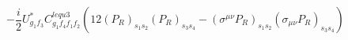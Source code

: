 %
\begin{dmath*}
%
  -  \frac{i}{2}U_{g_1 f_3}^* C^{lequ3}_{g_1 f_4 f_1 f_2} \left(12 (P_R)_{s_1 s_2} (P_R)_{s_3 s_4} - (\sigma^{\mu\nu} P_R)_{s_1 s_2} (\sigma_{\mu\nu} P_R)_{s_3 s_4}\right)
%
\end{dmath*}
%
